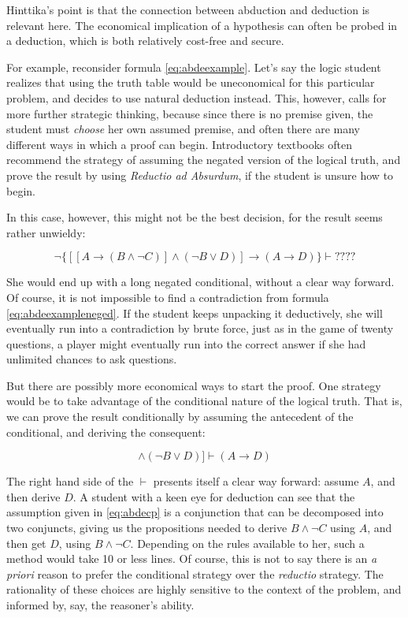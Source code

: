 Hinttika's point is that the connection between abduction and deduction is relevant here. The economical implication of a hypothesis can often be probed in a deduction, which is both relatively cost-free and secure. 

For example, reconsider formula \ref{eq:abdeexample}. Let's say the logic student realizes that using the truth table would be uneconomical for this particular problem, and decides to use natural deduction instead. This, however, calls for more further strategic thinking, because since there is no premise given, the student must \emph{choose} her own assumed premise, and often there are many different ways in which a proof can begin. Introductory textbooks often recommend the strategy of  assuming the negated version of the logical truth, and prove the result by using \emph{Reductio ad Absurdum}, if the student is unsure how to begin.

 In this case, however, this might not be the best decision, for the result seems rather unwieldy:
 
 \begin{equation}
	  \neg \{[[A\to(B\wedge \neg C)] \wedge (\neg B \vee D) ]\to (A\to D)\}\vdash ????
	\label{eq:abdeexampleneged}
\end{equation}

She would end up with a long negated conditional, without a clear way forward. Of course, it is not impossible to find a contradiction from  formula \ref{eq:abdeexampleneged}. If the student keeps unpacking it deductively, she will eventually run into a contradiction by brute force, just as in the game of twenty questions, a player might eventually run into the correct answer if she had unlimited chances to ask questions. 

But there are possibly more economical ways to start the proof.  One strategy would be to take advantage of the conditional nature of the logical truth. That is, we can prove the result conditionally by assuming the antecedent of the conditional, and deriving the consequent:

\begin{equation}
	 [[A\to(B\wedge \neg C)] \wedge (\neg B \vee D) ]\vdash (A\to D)
	\label{eq:abdecp}
\end{equation}

The right hand side of the $\vdash$ presents itself a clear way forward: assume $A$, and then derive $D$.  A student with a keen eye for deduction can see that the assumption given in \ref{eq:abdecp} is a conjunction that can be decomposed into two conjuncts, giving us the propositions needed to derive $B\wedge \neg C$ using $A$, and then get $D$, using $B\wedge \neg C$.  Depending on the rules available to her, such a method would take 10 or less lines. Of course, this is not to say there is an \emph{a priori} reason to prefer the conditional strategy over the \emph{reductio} strategy. The rationality of these choices are highly sensitive to the context of the problem, and informed by, say, the reasoner's ability. 

